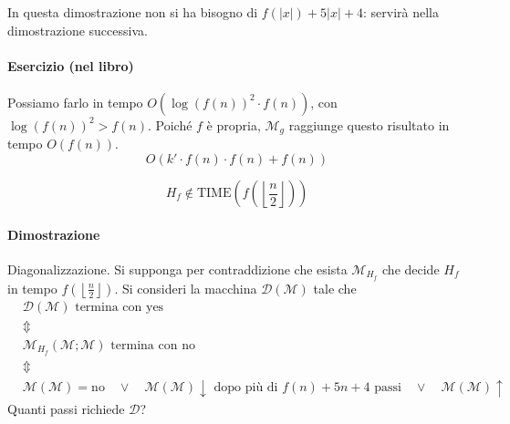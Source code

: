 In questa dimostrazione non si ha bisogno di $f(|x|)+5|x|+4$: servirà nella dimostrazione successiva.

\paragraph{Esercizio (nel libro)} Possiamo farlo in tempo $O(\log(f(n))^2\cdot f(n))$, con $\log(f(n))^2>f(n)$. Poiché $f$ è propria, $\mathcal{M}_g$ raggiunge questo risultato in tempo $O(f(n))$.
$$
    O\left(k'\cdot f(n)\cdot f(n)+f(n)\right)
$$

\begin{lemma}
    $$
        H_f \notin \text{TIME}\left( f\left(\left\lfloor \frac{n}{2} \right\rfloor\right)\right)
    $$
\end{lemma}
\paragraph{Dimostrazione} Diagonalizzazione. Si supponga per contraddizione che esista $\mathcal{M}_{H_f}$ che decide $H_f$ in tempo $f\left(\left\lfloor \frac{n}{2} \right\rfloor\right)$. Si consideri la macchina $\mathcal{D}(\mathcal{M})$ tale che
\begin{eqnarray*}
    &\mathcal{D}(\mathcal{M}) \text{ termina con yes}&\\
    &\Updownarrow&\\
    &\mathcal{M}_{H_f}(\mathcal{M};\mathcal{M}) \text{ termina con no}&\\
    &\Updownarrow&\\
    & \mathcal{M}(\mathcal{M})=\text{no} \quad\lor\quad
    \mathcal{M}(\mathcal{M})\downarrow \text{ dopo più di } f(n)+5n+4 \text{ passi} \quad\lor\quad 
    \mathcal{M}(\mathcal{M})\uparrow
\end{eqnarray*}
Quanti passi richiede $\mathcal{D}$?
